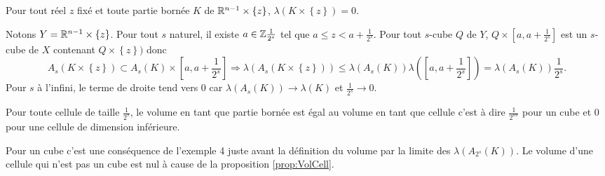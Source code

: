 \begin{propn}\label{prop:VolCell}
 Pour tout réel $z$ fixé et toute partie bornée $K$ de $\mathbb{R}^{n-1} \times \left\lbrace z \right\rbrace$, $\lambda(K\times \left\lbrace z \right\rbrace) = 0$.
\end{propn}
\begin{demo}
Notons $Y = \mathbb{R}^{n-1} \times \left\lbrace z \right\rbrace$. Pour tout $s$ naturel, il existe $a \in \mathbb{Z} \frac{1}{2^s}$ tel que $a \leq z < a+ \frac{1}{2^s}$. Pour tout $s$-cube $Q$ de $Y$, $Q\times [a, a+ \frac{1}{2^s}]$ est un $s$-cube de $X$ contenant $Q\times \left\lbrace z \right\rbrace)$ donc
\begin{displaymath}
A_s(K\times \left\lbrace z \right\rbrace) \subset A_s(K) \times [a, a+ \frac{1}{2^s}]
\Rightarrow
\lambda(A_s(K\times \left\lbrace z \right\rbrace)) \leq \lambda(A_s(K)) \lambda([a, a+ \frac{1}{2^s}])
 = \lambda(A_s(K)) \frac{1}{2^s}.
\end{displaymath}
Pour $s$ à l'infini, le terme de droite tend vers $0$ car $\lambda(A_s(K))\rightarrow \lambda(K)$ et $\frac{1}{2^s}\rightarrow 0$.
\end{demo}

\begin{propn}
 Pour toute cellule de taille $\frac{1}{2^s}$, le volume en tant que partie bornée est égal au volume en tant que cellule c'est à dire $\frac{1}{2^{ns}}$ pour un cube et $0$ pour une cellule de dimension inférieure.
\end{propn}
\begin{demo}
 Pour un cube c'est une conséquence de l'exemple 4 juste avant la définition du volume par la limite des $\lambda(A_{2^s}(K))$. Le volume d'une cellule qui n'est pas un cube est nul à cause de la proposition \ref{prop:VolCell}.
\end{demo}


